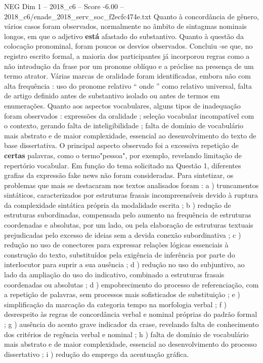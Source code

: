 \begin{textsample}{NEG Dim 1 – 2018\_c6 – Score -6.00 – 2018\_c6/enade\_2018\_serv\_soc\_f2ecfc474e.txt}
Quanto à concordância de gênero, vários casos foram observados, normalmente no âmbito de sintagmas nominais longos, em que o adjetivo \textbf{está} afastado do substantivo.
Quanto à questão da colocação pronominal, foram poucos os desvios observados.
Concluiu -se que, no registro escrito formal, a maioria dos participantes já incorporou regras como a não introdução da frase por um pronome oblíquo e a próclise na presença de um termo atrator.
Várias marcas de oralidade foram identificadas, embora não com alta frequência : uso do pronome relativo “ onde ” como relativo universal, falta de artigo definido antes de substantivo isolado ou antes de termos em enumerações.
Quanto aos aspectos vocabulares, alguns tipos de inadequação foram observados : expressões da oralidade ; seleção vocabular incompatível com o contexto, gerando falta de inteligibilidade ; falta de domínio de vocabulário mais abstrato e de maior complexidade, essencial ao desenvolvimento do texto de base dissertativa.
O principal aspecto observado foi a excessiva repetição de \textbf{certas} palavras, como o termo"pessoa", por exemplo, revelando limitação de repertório vocabular.
Em função do tema solicitado na Questão 1, diferentes grafias da expressão fake news não foram consideradas.
Para sintetizar, os problemas que mais se destacaram nos textos analisados foram : a ) truncamentos sintáticos, caracterizados por estruturas frasais incompreensíveis devido à ruptura da complexidade sintática própria da modalidade escrita ; b ) redução de estruturas subordinadas, compensada pelo aumento na frequência de estruturas coordenadas e absolutas, por um lado, ou pela elaboração de estruturas textuais prejudicadas pelo excesso de ideias sem a devida conexão subordinativa ; c ) redução no uso de conectores para expressar relações lógicas essenciais à construção do texto, substituídos pela exigência de inferência por parte do interlocutor para suprir a sua ausência ; d ) redução no uso do subjuntivo, ao lado da ampliação do uso do indicativo, combinado a estruturas frasais coordenadas ou absolutas ; d ) empobrecimento do processo de referenciação, com a repetição de palavras, sem processos mais sofisticados de substituição ; e ) simplificação da marcação da categoria tempo na morfologia verbal ; f ) desrespeito às regras de concordância verbal e nominal próprias do padrão formal ; g ) ausência do acento grave indicador da crase, revelando falta de conhecimento dos critérios de regência verbal e nominal ; h ) falta de domínio de vocabulário mais abstrato e de maior complexidade, essencial ao desenvolvimento do processo dissertativo ; i ) redução do emprego da acentuação gráfica.

\end{textsample}
